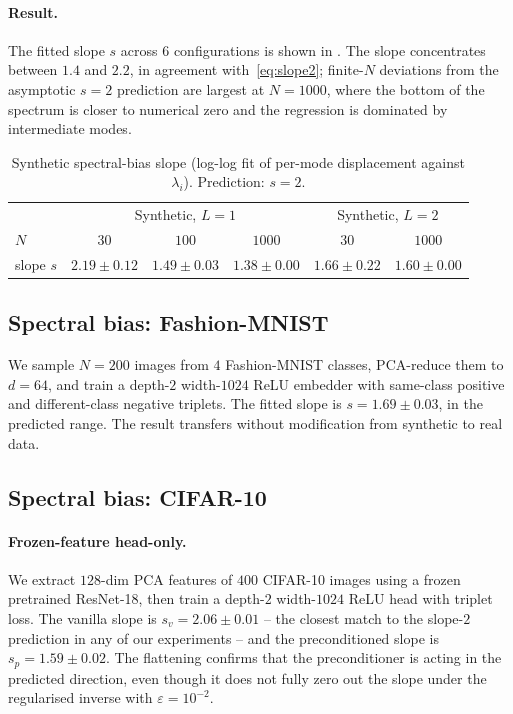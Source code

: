 \documentclass[11pt]{article}
\theoremstyle{definition}
\theoremstyle{plain}
\begin{document}
\paragraph{Result.}
The fitted slope $s$ across $6$ configurations is shown in
. The slope concentrates between $1.4$ and $2.2$, in
agreement with~\eqref{eq:slope2}; finite-$N$ deviations from the asymptotic
$s=2$ prediction are largest at $N=1000$, where the bottom of the spectrum
is closer to numerical zero and the regression is dominated by intermediate
modes.

\begin{table}[h]
\centering
\begin{tabular}{lccc|cc}
\toprule
& \multicolumn{3}{c}{Synthetic, $L=1$} & \multicolumn{2}{c}{Synthetic, $L=2$} \\
$N$ & $30$ & $100$ & $1000$ & $30$ & $1000$ \\
\midrule
slope $s$ & $2.19\pm0.12$ & $1.49\pm0.03$ & $1.38\pm0.00$ & $1.66\pm0.22$ & $1.60\pm0.00$ \\
\bottomrule
\end{tabular}
\caption{Synthetic spectral-bias slope (log-log fit of per-mode displacement
against $\lambda_i$). Prediction: $s=2$.}
\label{tab:slopes}
\end{table}

\subsection{Spectral bias: Fashion-MNIST}
\label{sec:fashion}

We sample $N=200$ images from $4$ Fashion-MNIST classes, PCA-reduce them to
$d=64$, and train a depth-$2$ width-$1024$ ReLU embedder with same-class
positive and different-class negative triplets. The fitted slope is
$s=1.69\pm0.03$, in the predicted range. The result transfers without
modification from synthetic to real data.

\subsection{Spectral bias: CIFAR-10}
\label{sec:cifar}

\paragraph{Frozen-feature head-only.}
We extract $128$-dim PCA features of $400$ CIFAR-10 images using a frozen
pretrained ResNet-18, then train a depth-$2$ width-$1024$ ReLU head with
triplet loss. The vanilla slope is $s_v=2.06\pm0.01$ -- the closest match
to the slope-$2$ prediction in any of our experiments -- and the
preconditioned slope is $s_p=1.59\pm0.02$. The flattening confirms that the
preconditioner is acting in the predicted direction, even though it does not
fully zero out the slope under the regularised inverse with $\varepsilon=10^{-2}$.
\end{document}
